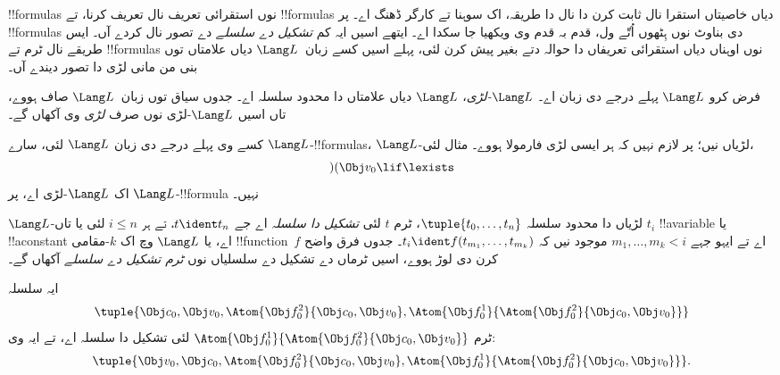 \documentclass[../../../include/open-logic-section]{subfiles}
\begin{document}


!!{formula}s نوں استقرائی تعریف نال تعریف کرنا، تے !!{formula}s
دیاں خاصیتاں استقرا نال ثابت کرن دا نال دا طریقہ، اک سوہنا تے
کارگر ڈھنگ اے۔ پر !!{formula}s دی بناوٹ نوں ہِٹھوں اُتّے ول،
قدم بہ قدم وی ویکھیا جا سکدا اے۔ ایتھے اسیں ایہ کم
\emph{تشکیل دے سلسلے} دے تصور نال کردے آں۔
%
ایس طریقے نال ٹرم تے !!{formula}s نوں اوہناں دیاں استقرائی
تعریفاں دا حوالہ دتے بغیر پیش کرن لئی، پہلے اسیں کسے
زبان~$\Lang L$ دیاں علامتاں توں بنی من مانی لڑی دا تصور دیندے آں۔

\begin{defn}[لڑیاں]
فرض کرو $\Lang L$ پہلے درجے دی زبان اے۔ \emph{$\Lang
L$-لڑی}، $\Lang L$ دیاں علامتاں دا محدود سلسلہ اے۔ جدوں
سیاق توں زبان~$\Lang L$ صاف ہووے، تاں اسیں
$\Lang L$-لڑی نوں صرف \emph{لڑی} وی آکھاں گے۔
\end{defn}

\begin{ex}
کسے وی پہلے درجے دی زبان $\Lang L$ لئی، سارے
$\Lang L$-!!{formula}s، $\Lang L$-لڑیاں نیں؛ پر
لازم نہیں کہ ہر ایسی لڑی فارمولا ہووے۔ مثال لئی،
\[)(\Obj v_0\lif\lexists\] اک $\Lang L$-لڑی اے،
پر $\Lang L$-!!{formula} نہیں۔
\end{ex}

\begin{defn}
$\Lang L$-لڑیاں دا محدود سلسلہ $\tuple{t_0,\dotsc,t_n}$،
ٹرم $t$ لئی \emph{تشکیل دا سلسلہ} اے جے $t \ident t_n$،
تے ہر $i \leq n$ لئی یا تاں $t_i$ !!a{variable} یا
!!a{constant} اے، یا $\Lang L$ وچ اک $k$-مقامی
!!{function}~$f$ اے تے ایہو جہے $m_1,\dotsc,m_k < i$
موجود نیں کہ $t_i \ident f(t_{m_1},\dotsc,t_{m_k})$۔
جدوں فرق واضح کرن دی لوڑ ہووے، اسیں ٹرماں دے تشکیل دے سلسلیاں نوں
\emph{ٹرم تشکیل دے سلسلے} آکھاں گے۔
\end{defn}

\begin{ex}
ایہ سلسلہ
\[
    \tuple{\Obj c_0, \Obj v_0, \Atom{\Obj f^2_0}{\Obj c_0, \Obj v_0}, \Atom{\Obj f^1_0}{\Atom{\Obj f^2_0}{\Obj c_0, \Obj v_0}}}
\]
ٹرم $\Atom{\Obj f^1_0}{\Atom{\Obj
f^2_0}{\Obj c_0, \Obj v_0}}$ لئی تشکیل دا سلسلہ اے،
تے ایہ وی:
\[
    \tuple{\Obj v_0, \Obj c_0, \Atom{\Obj f^2_0}{\Obj c_0, \Obj v_0}, \Atom{\Obj f^1_0}{\Atom{\Obj f^2_0}{\Obj c_0, \Obj v_0}}}.
\]
\end{ex}
\end{document}
